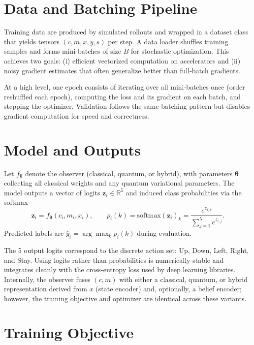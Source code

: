 \documentclass[11pt]{article}
\begin{document}
\section{Data and Batching Pipeline}

Training data are produced by simulated rollouts and wrapped in a dataset class that yields tensors $(c,m,x,y,s)$ per step. A data loader shuffles training samples and forms mini-batches of size $B$ for stochastic optimization. This achieves two goals: (i) efficient vectorized computation on accelerators and (ii) noisy gradient estimates that often generalize better than full-batch gradients.

At a high level, one epoch consists of iterating over all mini-batches once (order reshuffled each epoch), computing the loss and its gradient on each batch, and stepping the optimizer. Validation follows the same batching pattern but disables gradient computation for speed and correctness.

\section{Model and Outputs}

Let $f_{\bm{\theta}}$ denote the observer (classical, quantum, or hybrid), with parameters $\bm{\theta}$ collecting all classical weights and any quantum variational parameters. The model outputs a vector of logits $\bm{z}_i \in \mathbb{R}^5$ and induced class probabilities via the softmax
\begin{equation}
  \bm{z}_i = f_{\bm{\theta}}(c_i, m_i, x_i),\qquad
  p_i(k) = \mathrm{softmax}(\bm{z}_i)_k = \frac{e^{z_{i,k}}}{\sum_{j=1}^{5} e^{z_{i,j}}}.
\end{equation}
Predicted labels are $\hat{y}_i = \arg\max_k p_i(k)$ during evaluation.

The 5 output logits correspond to the discrete action set: Up, Down, Left, Right, and Stay. Using logits rather than probabilities is numerically stable and integrates cleanly with the cross-entropy loss used by deep learning libraries. Internally, the observer fuses $(c,m)$ with either a classical, quantum, or hybrid representation derived from $x$ (state encoder) and, optionally, a belief encoder; however, the training objective and optimizer are identical across these variants.

\section{Training Objective}
\end{document}
